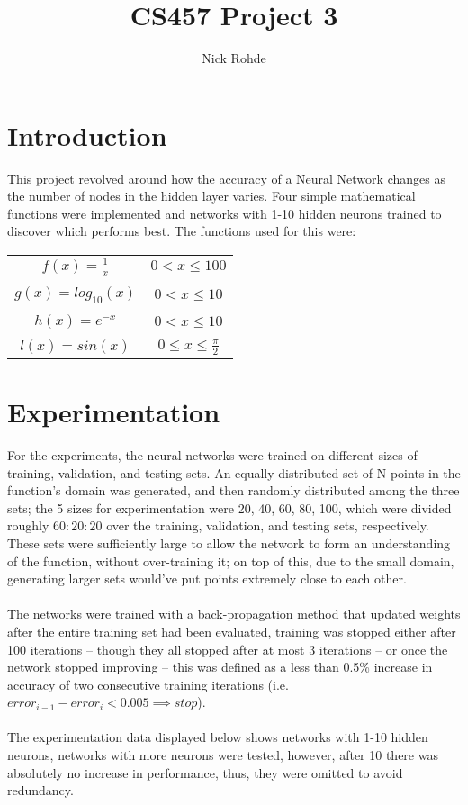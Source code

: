\documentclass{article}
\title{CS457 Project 3}
\author{Nick Rohde}
\begin{document}
\maketitle
\tableofcontents
\pagebreak

\section{Introduction} \label{S1}
This project revolved around how the accuracy of a Neural Network changes as the number of nodes in the hidden layer varies. Four simple mathematical functions were implemented and networks with 1-10 hidden neurons trained to discover which performs best. The functions used for this were:\\

\begin{minipage}{\linewidth}
	\centering
	\begin{tabular}{cc}\label{EQ}
		$f(x) = \frac{1}{x}$ & $0 < x \le 100$	\\
		& \\
		$g(x) = log_{10}(x)$ & $0 < x \le 10$	\\
		& \\
		$h(x) = e^{-x} $ & $0 < x \le 10$	\\
		&\\
		$l(x) = sin(x)$ & $0 \le x \le \frac{\pi}{2}$	\\
	\end{tabular}
\end{minipage}

\section{Experimentation} \label{S2}
For the experiments, the neural networks were trained on different sizes of training, validation, and testing sets. An equally distributed set of N points in the function's domain was generated, and then randomly distributed among the three sets; the 5 sizes for experimentation were 20, 40, 60, 80, 100, which were divided roughly $60:20:20$ over the training, validation, and testing sets, respectively. These sets were sufficiently large to allow the network to form an understanding of the function, without over-training it; on top of this, due to the small domain, generating larger sets would've put points extremely close to each other.\\
\\The networks were trained with a back-propagation method that updated weights after the entire training set had been evaluated, training was stopped either after 100 iterations -- though they all stopped after at most 3 iterations -- or once the network stopped improving -- this was defined as a less than 0.5\% increase in accuracy of two consecutive training iterations (i.e. $error_{i-1} - error_{i} < 0.005 \implies stop$).\\
\\The experimentation data displayed below shows networks with 1-10 hidden neurons, networks with more neurons were tested, however, after 10 there was absolutely no increase in performance, thus, they were omitted to avoid redundancy.
\end{document}
